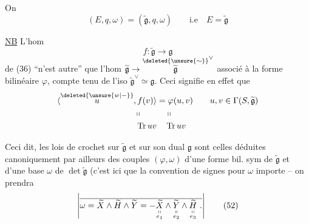 On 
\[
(E,q,\omega)=(\widetilde{\mathfrak g},q,\omega)\qquad\text{i.e}\quad E=\widetilde{\mathfrak g}\tag*{(50)}
\]


\uline{NB} L'hom 
\[
f:\widetilde{\mathfrak g}\longrightarrow\mathfrak g\tag*{(51)}
\]
de (36) ``n'est autre'' que l'hom $\widetilde{\mathfrak g}\to\overset{\deleted{\unsure{\sim}}}{\widetilde{\mathfrak g}}^\vee$ associé à la forme bilinéaire $\varphi$, compte tenu de l'iso $\widetilde{\mathfrak g}^\vee\simeq\mathfrak g$. Ceci signifie en effet que
\[
\begin{aligned}
\langle\overset{\deleted{\unsure{w|-}}}{u},f(v)\rangle&=\varphi(u,v)\qquad u,v\in\Gamma(S,\widetilde{\mathfrak g})\\
\shortparallel\qquad&\quad\shortparallel\\
\operatorname{Tr}uv&\quad\operatorname{Tr}uv
\end{aligned}
\]

Ceci dit, les lois de crochet sur $\widetilde{\mathfrak g}$ et sur son dual $\mathfrak g$ sont celles déduites canoniquement par ailleurs des couples $(\varphi,\omega)$ d'une forme bil. sym de $\widetilde{\mathfrak g}$ et d'une base $\omega$ de $\det\widetilde{\mathfrak g}$ (c'est ici que la convention de signes pour $\omega$ importe -- on prendra
\[
\left|\overline{\omega=\widetilde X\wedge\widetilde H\wedge\widetilde Y
=-\underset{\substack{\shortparallel\\e_1}}{\widetilde X}\wedge\underset{\substack{\shortparallel\\e_2}}{\widetilde Y}\wedge\underset{\substack{\shortparallel\\e_3}}{\widetilde H}\ .}\right|\tag*{(52)}
\]

